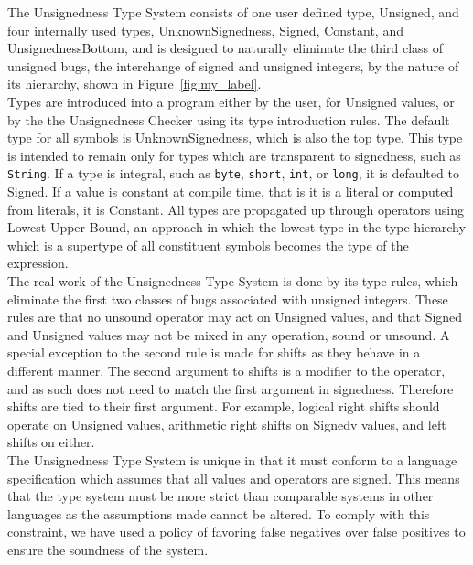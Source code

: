 \documentclass{sigplanconf}
\begin{document}
The Unsignedness Type System consists of one user defined type, Unsigned, and four internally used types, UnknownSignedness, Signed, Constant, and UnsignednessBottom, and is designed to naturally eliminate the third class of unsigned bugs, the interchange of signed and unsigned integers, by the nature of its hierarchy, shown in Figure~\ref{fig:my_label}.\\
\indent
Types are introduced into a program either by the user, for Unsigned values, or by the the Unsignedness Checker using its type introduction rules. The default type for all symbols is UnknownSignedness, which is also the top type. This type is intended to remain only for types which are transparent to signedness, such as \texttt{String}. If a type is integral, such as \texttt{byte}, \texttt{short}, \texttt{int}, or \texttt{long}, it is defaulted to Signed. If a value is constant at compile time, that is it is a literal or computed from literals, it is Constant. All types are propagated up through operators using Lowest Upper Bound, an approach in which the lowest type in the type hierarchy which is a supertype of all constituent symbols becomes the type of the expression.\\
\indent
The real work of the Unsignedness Type System is done by its type rules, which eliminate the first two classes of bugs associated with unsigned integers. These rules are that no unsound operator may act on Unsigned values, and that Signed and Unsigned values may not be mixed in any operation, sound or unsound. A special exception to the second rule is made for shifts as they behave in a different manner. The second argument to shifts is a modifier to the operator, and as such does not need to match the first argument in signedness. Therefore shifts are tied to their first argument. For example, logical right shifts should operate on Unsigned values, arithmetic right shifts on Signedv values, and left shifts on either.\\
\indent
The Unsignedness Type System is unique in that it must conform to a language specification which assumes that all values and operators are signed. This means that the type system must be more strict than comparable systems in other languages as the assumptions made cannot be altered. To comply with this constraint, we have used a policy of favoring false negatives over false positives to ensure the soundness of the system.


\end{document}
